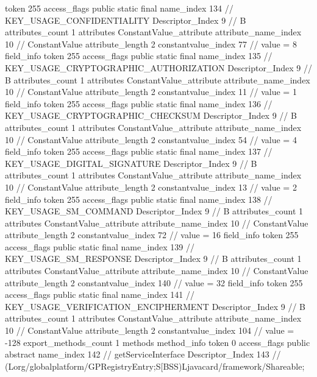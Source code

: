 {{{{{				token	255
				access_flags	public static final
				name_index	134		// KEY_USAGE_CONFIDENTIALITY
				Descriptor_Index	9		// B
				attributes_count	1
				attributes {
				ConstantValue_attribute {
					attribute_name_index	10		// ConstantValue
					attribute_length	2
					constantvalue_index	77		// value = 8
				}
				}
			}
			field_info {
				token	255
				access_flags	public static final
				name_index	135		// KEY_USAGE_CRYPTOGRAPHIC_AUTHORIZATION
				Descriptor_Index	9		// B
				attributes_count	1
				attributes {
				ConstantValue_attribute {
					attribute_name_index	10		// ConstantValue
					attribute_length	2
					constantvalue_index	11		// value = 1
				}
				}
			}
			field_info {
				token	255
				access_flags	public static final
				name_index	136		// KEY_USAGE_CRYPTOGRAPHIC_CHECKSUM
				Descriptor_Index	9		// B
				attributes_count	1
				attributes {
				ConstantValue_attribute {
					attribute_name_index	10		// ConstantValue
					attribute_length	2
					constantvalue_index	54		// value = 4
				}
				}
			}
			field_info {
				token	255
				access_flags	public static final
				name_index	137		// KEY_USAGE_DIGITAL_SIGNATURE
				Descriptor_Index	9		// B
				attributes_count	1
				attributes {
				ConstantValue_attribute {
					attribute_name_index	10		// ConstantValue
					attribute_length	2
					constantvalue_index	13		// value = 2
				}
				}
			}
			field_info {
				token	255
				access_flags	public static final
				name_index	138		// KEY_USAGE_SM_COMMAND
				Descriptor_Index	9		// B
				attributes_count	1
				attributes {
				ConstantValue_attribute {
					attribute_name_index	10		// ConstantValue
					attribute_length	2
					constantvalue_index	72		// value = 16
				}
				}
			}
			field_info {
				token	255
				access_flags	public static final
				name_index	139		// KEY_USAGE_SM_RESPONSE
				Descriptor_Index	9		// B
				attributes_count	1
				attributes {
				ConstantValue_attribute {
					attribute_name_index	10		// ConstantValue
					attribute_length	2
					constantvalue_index	140		// value = 32
				}
				}
			}
			field_info {
				token	255
				access_flags	public static final
				name_index	141		// KEY_USAGE_VERIFICATION_ENCIPHERMENT
				Descriptor_Index	9		// B
				attributes_count	1
				attributes {
				ConstantValue_attribute {
					attribute_name_index	10		// ConstantValue
					attribute_length	2
					constantvalue_index	104		// value = -128
				}
				}
			}
			}
			export_methods_count	1
			methods {
				method_info {
					token	0
					access_flags	public abstract
					name_index	142		// getServiceInterface
					Descriptor_Index	143		// (Lorg/globalplatform/GPRegistryEntry;S[BSS)Ljavacard/framework/Shareable;
}}}}}
